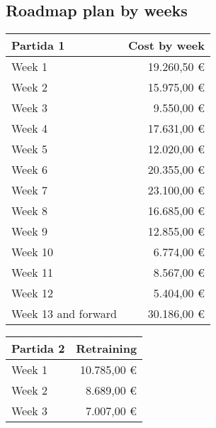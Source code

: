 \subsection{Roadmap plan by weeks}\label{subsec:time-plan-by-weeks}

\begin{center}
    \begin{tabular}{|l|r|}
        \hline
        \toprule
        \textbf{Partida 1}  & \textbf{Cost by week} \\ \hline
        \midrule
        Week 1              & 19.260,50 \euro       \\ \hline
        Week 2              & 15.975,00 \euro       \\  \hline
        Week 3              & 9.550,00 \euro        \\ \hline
        Week 4              & 17.631,00 \euro       \\ \hline
        Week 5              & 12.020,00 \euro       \\ \hline
        Week 6              & 20.355,00 \euro       \\ \hline
        Week 7              & 23.100,00 \euro       \\ \hline
        Week 8              & 16.685,00 \euro       \\ \hline
        Week 9              & 12.855,00 \euro       \\ \hline
        Week 10             & 6.774,00 \euro        \\ \hline
        Week 11             & 8.567,00 \euro        \\ \hline
        Week 12             & 5.404,00 \euro        \\ \hline
        Week 13 and forward & 30.186,00 \euro       \\ \hline
        \bottomrule
    \end{tabular}
\end{center}

\begin{center}
    \begin{tabular}{|l|r|}
        \hline
        \toprule
        \textbf{Partida 2} & \textbf{Retraining} \\ \hline
        \midrule
        Week 1             & 10.785,00 \euro     \\ \hline
        Week 2             & 8.689,00 \euro      \\  \hline
        Week 3             & 7.007,00 \euro      \\ \hline
        \bottomrule
    \end{tabular}
\end{center}

